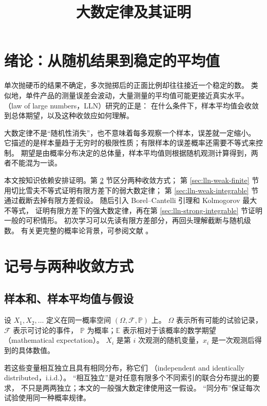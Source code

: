 \documentclass[UTF8]{ctexart}
\title{大数定律及其证明}
\author{}
\date{}
\begin{document}
\maketitle
\tableofcontents

\section{绪论：从随机结果到稳定的平均值}
\label{sec:lln-introduction}

单次抛硬币的结果不确定，多次抛掷后的正面比例却往往接近一个稳定的数。
类似地，单件产品的测量误差会波动，大量测量的平均值可能更接近真实水平。
（law of large numbers，LLN）研究的正是：
在什么条件下，样本平均值会收敛到总体期望，以及这种收敛应如何理解。

大数定律不是“随机性消失”，也不意味着每多观察一个样本，误差就一定缩小。
它描述的是样本量趋于无穷时的极限性质；有限样本的误差概率还需要不等式来控制。
期望是由概率分布决定的总体量，样本平均值则根据随机观测计算得到，两者不能混为一谈。

本文按知识依赖安排证明。第 \ref{sec:lln-convergence} 节区分两种收敛方式；
第 \ref{sec:lln-weak-finite} 节用切比雪夫不等式证明有限方差下的弱大数定律；
第 \ref{sec:lln-weak-integrable} 节通过截断去掉有限方差假设。
随后引入 Borel--Cantelli 引理和 Kolmogorov 最大不等式，
证明有限方差下的强大数定律，再在第 \ref{sec:lln-strong-integrable} 节证明一般的可积情形。
初次学习可以先读有限方差部分，再回头理解截断与随机级数。
有关更完整的概率论背景，可参阅文献 \cite{durrett-lln,sheffield-lln}。

\section{记号与两种收敛方式}
\label{sec:lln-convergence}

\subsection{样本和、样本平均值与假设}

设 $X_1,X_2,\ldots$ 定义在同一概率空间 $(\Omega,\mathcal F,\mathbb P)$ 上。
$\Omega$ 表示所有可能的试验记录，$\mathcal F$ 表示可讨论的事件，
$\mathbb P$ 为概率；$\mathbb E$ 表示相对于该概率的数学期望（mathematical expectation）。
$X_i$ 是第 $i$ 次观测的随机变量，$x_i$ 是一次观测后得到的具体数值。

若这些变量相互独立且具有相同分布，称它们
（independent and identically distributed，i.i.d.）。
“相互独立”是对任意有限多个不同索引的联合分布提出的要求，
不只是两两独立；本文的一般强大数定律使用这一假设。
“同分布”保证每次试验使用同一种概率规律。
\end{document}
